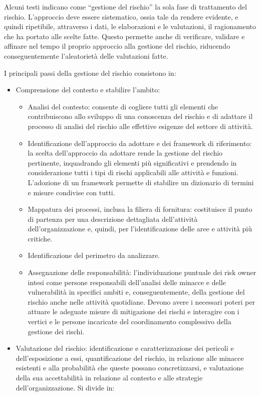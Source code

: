 Alcuni testi indicano come “gestione del rischio” la sola fase di trattamento del rischio.
L’approccio deve essere sistematico, ossia tale da rendere evidente, e quindi ripetibile, attraverso i dati, le elaborazioni e le valutazioni, il ragionamento che ha portato alle scelte fatte. Questo permette anche di verificare, validare e affinare nel tempo il proprio approccio alla gestione del rischio, riducendo conseguentemente l’aleatorietà delle valutazioni fatte.

I principali passi della gestione del rischio consistono in: 
\begin{itemize}
    \item Comprensione del contesto e stabilire l’ambito:
        \begin{itemize}
            \item Analisi del contesto: consente di cogliere tutti gli elementi che contribuiscono allo sviluppo di una conoscenza del rischio e di adattare il processo di analisi del rischio alle effettive esigenze del settore di attività.
            \item Identificazione dell’approccio da adottare e dei framework di riferimento: la scelta dell’approccio da adottare rende la gestione del rischio pertinente, inquadrando gli elementi più significativi e prendendo in considerazione tutti i tipi di rischi applicabili alle attività e funzioni. L’adozione di un framework permette di stabilire un dizionario di termini e misure condivise con tutti.  
            \item Mappatura dei processi, inclusa la filiera di fornitura:  costituisce il punto di partenza per una descrizione dettagliata dell’attività dell’organizzazione e, quindi, per l’identificazione delle aree e attività più critiche. 
            \item Identificazione del perimetro da analizzare.
            \item Assegnazione delle responsabilità: l’individuazione puntuale dei risk owner intesi come persone responsabili dell’analisi delle minacce e delle vulnerabilità in specifici ambiti e, conseguentemente, della gestione del rischio anche nelle attività quotidiane. Devono avere i necessari poteri per attuare le adeguate misure di mitigazione dei rischi e interagire con i vertici e le persone incaricate del coordinamento complessivo della gestione dei rischi.
        \end{itemize}   
    \item Valutazione del rischio:  identificazione e caratterizzazione dei pericoli e dell’esposizione a essi, quantificazione del rischio, in relazione alle minacce esistenti e alla probabilità che queste possano concretizzarsi, e valutazione della sua accettabilità in relazione al contesto e alle strategie dell’organizzazione. Si divide in:

\end{itemize}
